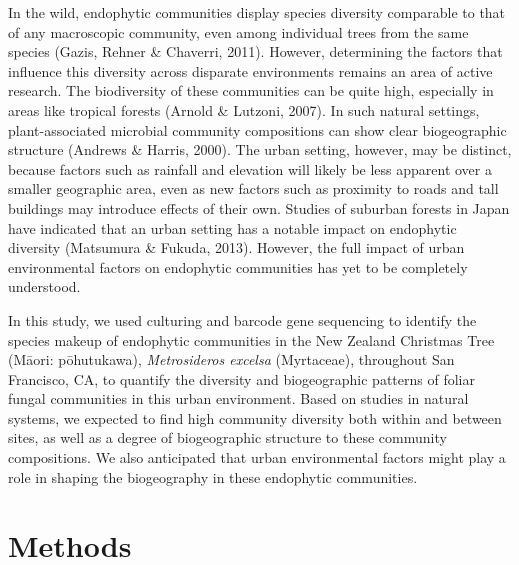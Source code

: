 \documentclass[fleqn,10pt,lineno]{wlpeerj} %
\begin{document}
In the wild, endophytic communities display species diversity comparable to that of any macroscopic community, even among individual trees from the same species (Gazis, Rehner \& Chaverri, 2011). However, determining the factors that influence this diversity across disparate environments remains an area of active research. The biodiversity of these communities can be quite high, especially in areas like tropical forests (Arnold \& Lutzoni, 2007). In such natural settings, plant-associated microbial community compositions can show clear biogeographic structure (Andrews \& Harris, 2000). The urban setting, however, may be distinct, because factors such as rainfall and elevation will likely be less apparent over a smaller geographic area, even as new factors such as proximity to roads and tall buildings may introduce effects of their own. Studies of suburban forests in Japan have indicated that an urban setting has a notable impact on endophytic diversity (Matsumura \& Fukuda, 2013). However, the full impact of urban environmental factors on endophytic communities has yet to be completely understood.

In this study, we used culturing and barcode gene sequencing to identify the species makeup of endophytic communities in the New Zealand Christmas Tree (Māori: pōhutukawa), \emph{Metrosideros excelsa} (Myrtaceae), throughout San Francisco, CA, to quantify the diversity and biogeographic patterns of foliar fungal communities in this urban environment. Based on studies in natural systems, we expected to find high community diversity both within and between sites, as well as a degree of biogeographic structure to these community compositions. We also anticipated that urban environmental factors might play a role in shaping the biogeography in these endophytic communities.

\hypertarget{methods}{%
\section*{Methods}\label{methods}}
\end{document}
